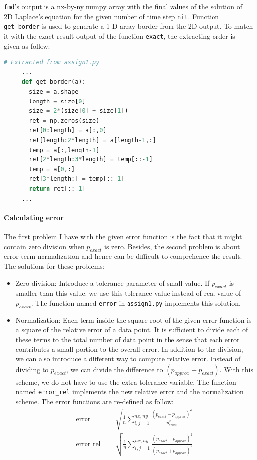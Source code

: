 \documentclass[a4paper,12pt]{article}
\begin{document}
\texttt{fmd}'s output is a nx-by-ny numpy array with the final values of the solution of 2D Laplace's equation for the given number of time step \texttt{nit}. Function \texttt{get\_border} is used to generate a 1-D array border from the 2D output. To match it with the exact result output of the function \texttt{exact}, the extracting order is given as follow:

\begin{lstlisting}[language=Python, caption={Get border solution from 2D FDM}, label={lst:border}]
     # Extracted from assign1.py
     ...
     def get_border(a):
       size = a.shape
       length = size[0]
       size = 2*(size[0] + size[1])
       ret = np.zeros(size)
       ret[0:length] = a[:,0]
       ret[length:2*length] = a[length-1,:]
       temp = a[:,length-1]
       ret[2*length:3*length] = temp[::-1]
       temp = a[0,:]
       ret[3*length:] = temp[::-1]
       return ret[::-1]
     ...
\end{lstlisting}

\paragraph{Calculating error} The first problem I have with the given error function is the fact that it might contain zero division when $p_{exact}$ is zero. Besides, the second problem is about error term normalization and hence can be difficult to comprehence the result. The solutions for these problems:
\begin{itemize}
  \item Zero division: Introduce a tolerance parameter of small value. If $p_{exact}$ is smaller than this value, we use this tolerance value instead of real value of $p_{exact}$. The function named \texttt{error} in \texttt{assign1.py} implements this solution.
  \item Normalization: Each term inside the square root of the given error function is a square of the relative error of a data point. It is sufficient to divide each of these terms to the total number of data point in the sense that each error contributes a small portion to the overall error. In addition to the division, we can also introduce a different way to compute relative error. Instead of dividing to $p_{exact}$, we can divide the difference to $(p_{approx} + p_{exact})$. With this scheme, we do not have to use the extra tolerance variable. The function named \texttt{error\_rel} implements the new relative error and the normalization scheme. The error functions are re-defined as follow:
\begin{equation*}
  \begin{aligned}
    \mbox{error} & = \sqrt{\frac{1}{n}\sum_{i,j=1}^{nx,ny}\frac{(p_{exact} - p_{approx})^2}{p_{exact}^2}} \\
    \mbox{error\_rel} & = \sqrt{\frac{1}{n}\sum_{i,j=1}^{nx,ny}\frac{(p_{exact} - p_{approx})^2}{(p_{exact} + p_{approx})^2}} \\
  \end{aligned}
\end{equation*}
\end{itemize}
\end{document}

